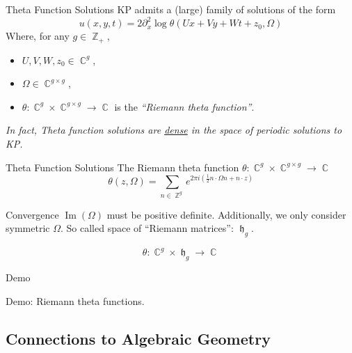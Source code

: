 \documentclass {beamer}
\DeclareMathOperator{\ZZ}{\mathbb{Z}}
\DeclareMathOperator{\CC}{\mathbb{C}}
\DeclareMathOperator{\hh}{\mathfrak{h}}
\DeclareMathOperator{\im}{\text{Im}}
\begin{document}
\begin{frame}{Theta Function Solutions}{}
  KP admits a (large) family of solutions of the form
  \[
  u(x,y,t) = 2 \partial_x^2 \log
  \theta(Ux + Vy + Wt + z_0, \Omega)
  \]
  Where, for any $g \in \ZZ_+$,
  \begin{itemize}
    \item $U,V,W,z_0 \in \CC^g$,
    \item $\Omega \in \CC^{g \times g}$,
    \item $\theta : \CC^g \times \CC^{g \times g} \to \CC$
      is the {\it``Riemann theta function''}.
  \end{itemize}

  \vspace{20pt}

  \begin{block}
  {\it In fact, Theta function solutions are \underline{dense} in the
    space of periodic solutions to KP.}
  \end{block}
\end{frame}

\begin{frame}{Theta Function Solutions}
  The Riemann theta function $\theta:\CC^g \times \CC^{g \times g} \to
  \CC$
  \[
  \theta(z,\Omega) = \sum_{n \in \ZZ^g}
  e^{
    2 \pi i
    \left( \tfrac{1}{2} n \cdot \Omega n + n \cdot z \right)
  }
  \]
  \begin{block}{Convergence}
    $\im(\Omega)$ must be positive definite. Additionally, we only
    consider symmetric $\Omega$. So called space of ``Riemann
    matrices'': $\hh_g$.
  \end{block}
  \[
    \theta:\CC^g \times \hh_g \to \CC
  \]
\end{frame}

\begin{frame}{Demo}{}
  \begin{center}
    Demo: Riemann theta functions.
  \end{center}
\end{frame}



\subsection{Connections to Algebraic Geometry}
\end{document}
